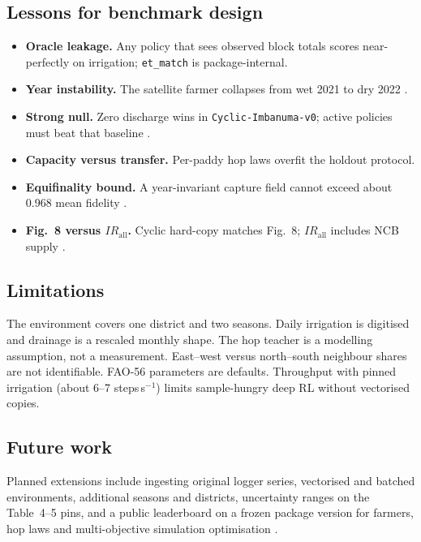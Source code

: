 \documentclass[preprint,12pt,authoryear,review]{elsarticle}
\begin{document}
\subsection{Lessons for benchmark design}

\begin{itemize}
\item \textbf{Oracle leakage.} Any policy that sees observed block totals scores near-perfectly on irrigation; \texttt{et\_match} is package-internal.
\item \textbf{Year instability.} The satellite farmer collapses from wet 2021 to dry 2022 \citep{gauch2021}.
\item \textbf{Strong null.} Zero discharge wins in \texttt{Cyclic-Imbanuma-v0}; active policies must beat that baseline \citep{kelly2024}.
\item \textbf{Capacity versus transfer.} Per-paddy hop laws overfit the holdout protocol.
\item \textbf{Equifinality bound.} A year-invariant capture field cannot exceed about 0.968 mean fidelity \citep{beven2006}.
\item \textbf{Fig.~8 versus $IR_{\mathrm{all}}$.} Cyclic hard-copy matches Fig.~8; $IR_{\mathrm{all}}$ includes NCB supply \citep{okura2025}.
\end{itemize}

\subsection{Limitations}

The environment covers one district and two seasons. Daily irrigation is digitised and drainage is a rescaled monthly shape. The hop teacher is a modelling assumption, not a measurement. East--west versus north--south neighbour shares are not identifiable. FAO-56 parameters are defaults. Throughput with pinned irrigation (about 6--7 steps\,s$^{-1}$) limits sample-hungry deep RL without vectorised copies.

\subsection{Future work}

Planned extensions include ingesting original logger series, vectorised and batched environments, additional seasons and districts, uncertainty ranges on the Table~4--5 pins, and a public leaderboard on a frozen package version for farmers, hop laws and multi-objective simulation optimisation \citep{giuliani2021,lemmen2024}.
\end{document}
